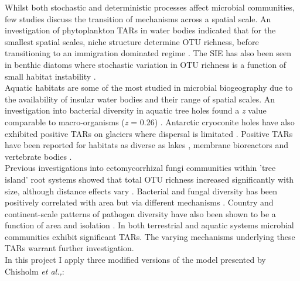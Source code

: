 \noindent Whilst both stochastic and deterministic processes affect microbial communities, few studies discuss the transition of mechanisms across a spatial scale. An investigation of phytoplankton TARs in water bodies indicated that for the smallest spatial scales, niche structure determine OTU richness, before transitioning to an immigration dominated regime \cite{varbiro2017functional}. The SIE has also been seen in benthic diatoms where stochastic variation in OTU richness is a function of small habitat instability \cite{bolgovics2016species}. \\

\noindent Aquatic habitats are some of the most studied in microbial biogeography due to the availability of insular water bodies and their range of spatial scales. An investigation into bacterial diversity in aquatic tree holes found a \textit{z} value comparable to macro-organisms (\textit{z} = 0.26) \cite{bell2005larger}. Antarctic cryoconite holes have also exhibited positive TARs on glaciers where dispersal is limitated \cite{darcy2018island}. Positive TARs have been reported for habitats as diverse as lakes \cite{battes2019species}, membrane bioreactors \cite{van2006bacterial} \cite{van2005island} and vertebrate bodies \cite{godon2016vertebrate}.\\

\noindent Previous investigations into ectomycorrhizal fungi communities within 'tree island' root systems showed that total OTU richness increased significantly with size, although distance effects vary \cite{glassman2017theory} \cite{peay2007strong}. Bacterial and fungal diversity has been positively correlated with area but via different mechanisms \cite{li2020island}. Country and continent-scale patterns of pathogen diversity have also been shown to be a function of area and isolation \cite{jean2016equilibrium} \cite{cashdan2014biogeography}. In both terrestrial and aquatic systems microbial communities exhibit significant TARs. The varying mechanisms underlying these TARs warrant further investigation. \\

\noindent In this project I apply three modified versions of the model presented by Chisholm \textit{et al.,}: \\

 \\
 \\
\\

